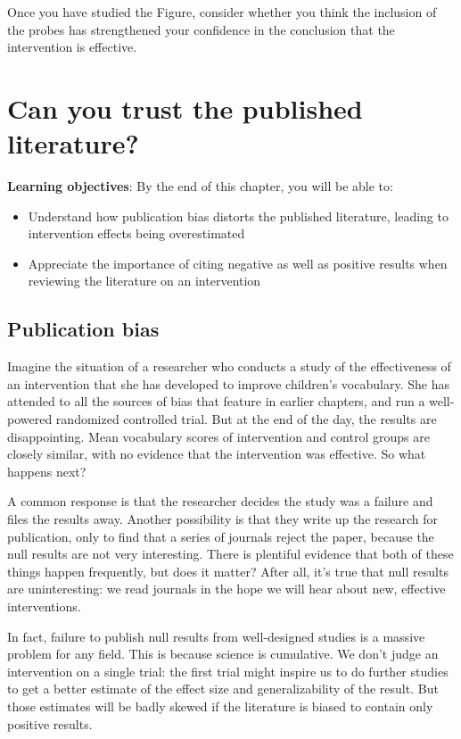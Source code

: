 \documentclass{krantz}
\begin{document}
Once you have studied the Figure, consider whether you think the inclusion of the probes has strengthened your confidence in the conclusion that the intervention is effective.

\hypertarget{pubbias}{%
\chapter{Can you trust the published literature?}\label{pubbias}}

\textbf{Learning objectives}: By the end of this chapter, you will be able to:

\begin{itemize}
\item
  Understand how publication bias distorts the published literature, leading to intervention effects being overestimated
\item
  Appreciate the importance of citing negative as well as positive results when reviewing the literature on an intervention
\end{itemize}

\hypertarget{publication-bias}{%
\section{Publication bias}\label{publication-bias}}

Imagine the situation of a researcher who conducts a study of the effectiveness of an intervention that she has developed to improve children's vocabulary. She has attended to all the sources of bias that feature in earlier chapters, and run a well-powered randomized controlled trial. But at the end of the day, the results are disappointing. Mean vocabulary scores of intervention and control groups are closely similar, with no evidence that the intervention was effective. So what happens next?

A common response is that the researcher decides the study was a failure and files the results away. Another possibility is that they write up the research for publication, only to find that a series of journals reject the paper, because the null results are not very interesting. There is plentiful evidence that both of these things happen frequently, but does it matter? After all, it's true that null results are uninteresting: we read journals in the hope we will hear about new, effective interventions.

In fact, failure to publish null results from well-designed studies is a massive problem for any field. This is because science is cumulative. We don't judge an intervention on a single trial: the first trial might inspire us to do further studies to get a better estimate of the effect size and generalizability of the result. But those estimates will be badly skewed if the literature is biased to contain only positive results.
\end{document}
